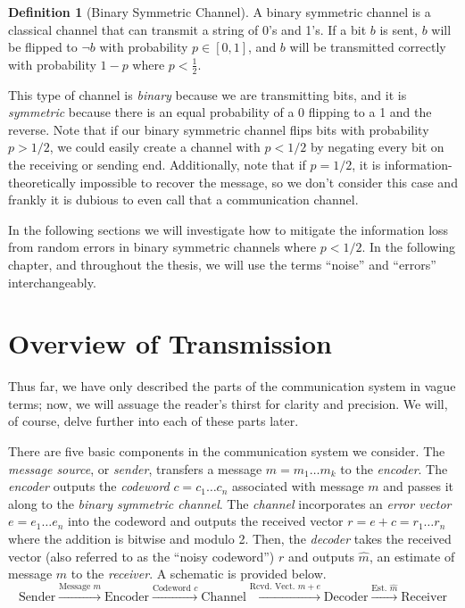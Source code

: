 \documentclass[12pt,twoside]{reedthesis}
\theoremstyle{definition}
\newtheorem{definition}[theorem]{Definition}
\begin{document}
\begin{definition}[Binary Symmetric Channel] A binary symmetric channel is a classical channel that can transmit a string of 0's and 1's. If a bit $b$ is sent, $b$ will be flipped to $\lnot b$ with probability $p \in [0,1]$, and $b$ will be transmitted correctly with probability $1-p$ where $p < \frac{1}{2}$.
\end{definition}

This type of channel is \textit{binary} because we are transmitting bits, and it is \textit{symmetric} because there is an equal probability of a 0 flipping to a 1 and the reverse. Note that if our binary symmetric channel flips bits with probability $p > 1/2$, we could easily create a channel with $p <1/2$ by negating every bit on the receiving or sending end. Additionally, note that if $p=1/2$, it is  information-theoretically impossible to recover the message, so we don't consider this case and frankly it is dubious to even call that a communication channel.

In the following sections we will investigate how to mitigate the information loss from random errors in binary symmetric channels where $p<1/2$. In the following chapter, and throughout the thesis, we will use the terms ``noise'' and ``errors'' interchangeably.

\section{Overview of Transmission}

Thus far, we have only described the parts of the communication system in vague terms; now, we will assuage the reader's thirst for clarity and precision. We will, of course, delve further into each of these parts later.

There are five basic components in the communication system we consider. The \textit{message source}, or \textit{sender}, transfers a message $m = m_1 \ldots m_k$ to the \textit{encoder}. The \textit{encoder} outputs the \textit{codeword} $c = c_1\ldots c_n$ associated with message $m$ and passes it along to the \textit{binary symmetric channel}. The \textit{channel} incorporates an \textit{error vector} $e = e_1 \ldots e_n$ into the codeword and outputs the received vector $r = e + c = r_1 \ldots r_n$ where the addition is bitwise and modulo 2. Then, the \textit{decoder} takes the received vector (also referred to as the ``noisy codeword'') $r$ and outputs $\hat{m}$, an estimate of message $m$ to the \textit{receiver}. A schematic is provided below.
\begin{equation*}
\text{Sender} \xrightarrow{\text{Message }m} \text{Encoder} \xrightarrow{\text{Codeword }c} \text{Channel} \xrightarrow{\text{Rcvd.~Vect.~}m+e} \text{Decoder} \xrightarrow{\text{Est. }\hat{m}} \text{Receiver}
\end{equation*}
\end{document}
